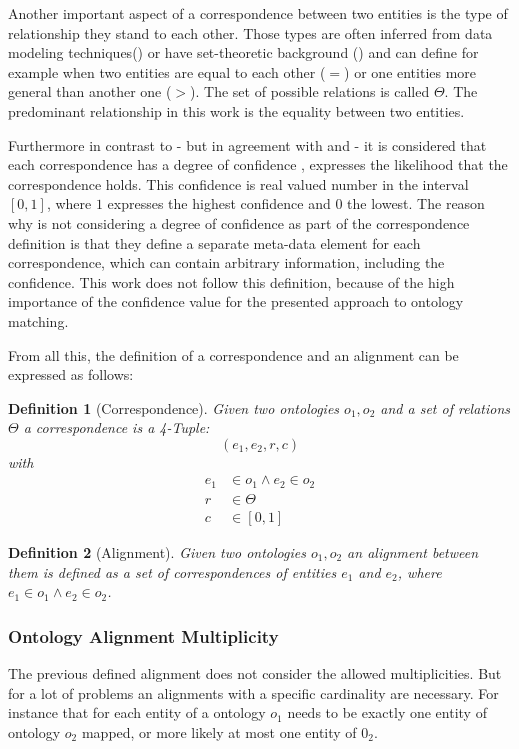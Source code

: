 \documentclass[11pt,titlepage,oneside,openany,a4paper]{report}
\newtheorem{definition}{Definition}[chapter]
\begin{document}
Another important aspect of a correspondence between two entities is the type of relationship they stand to each other. Those types are often inferred from data modeling techniques(\cite{Rahm:2001}) or have set-theoretic background (\cite{euzenat2013d}) and can define for example when two entities are equal to each other ($=$) or one entities more general than another one ($>$). The set of possible relations is called $\Theta$. The predominant relationship in this work is the equality between two entities.

Furthermore  in contrast to  \cite{euzenat2013d} - but in agreement with \cite{ehrig2006ontology} and \cite{Rahm:2001}- it is considered that each correspondence has a degree of confidence , expresses the likelihood that the correspondence holds. This confidence is real valued number in the interval $[0,1]$, where $1$ expresses the highest confidence and $0$ the lowest. The reason why \cite{euzenat2013d} is not considering a degree of confidence as part of the correspondence definition is that they define a separate meta-data element for each correspondence, which can contain arbitrary information, including the confidence. This work does not follow this definition, because of the high importance of the confidence value for the presented approach to ontology matching.

From all this, the definition of a correspondence and an alignment can be expressed as follows:
\begin{definition} [Correspondence] Given two ontologies $o_1,o_2$ and a set of relations $\Theta$ a correspondence is a 4-Tuple:
	\begin{equation*}
	(e_1,e_2,r,c)
	\end{equation*}
with
	\begin{eqnarray*}
	e_1 & \in o_1 \wedge  e_2 \in o_2 \\
	r & \in \Theta \\
	c & \in [0,1]
	\end{eqnarray*}
\end{definition}
\begin{definition} [Alignment] Given two ontologies $o_1, o_2$ an alignment between them is defined as a set of correspondences of entities $e_1$ and $e_2$, where $e_1 \in o_1 \wedge e_2 \in o_2$.
\end{definition}

\subsubsection{Ontology Alignment Multiplicity}
\label{sec:oa_multiplicity}
The previous defined alignment does not consider the allowed multiplicities. But for a lot of problems an alignments with a specific cardinality are necessary. For instance that for each entity of a ontology $o_1$ needs to be exactly one entity of ontology $o_2$ mapped, or more likely at most one entity of $0_2$.
\end{document}
